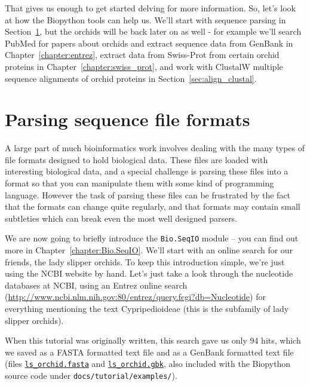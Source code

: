 \documentclass{report}
\begin{document}
That gives us enough to get started delving for more information. So, let's look at how the Biopython tools can help us.  We'll start with sequence parsing in Section~\ref{sec:sequence-parsing}, but the orchids will be back later on as well - for example we'll search PubMed for papers about orchids and extract sequence data from GenBank in Chapter~\ref{chapter:entrez}, extract data from Swiss-Prot from certain orchid proteins in Chapter~\ref{chapter:swiss_prot}, and work with ClustalW multiple sequence alignments of orchid proteins in Section~\ref{sec:align_clustal}.

\section{Parsing sequence file formats}
\label{sec:sequence-parsing}

A large part of much bioinformatics work involves dealing with the many types of file formats designed to hold biological data. These files are loaded with interesting biological data, and a special challenge is parsing these files into a format so that you can manipulate them with some kind of programming language. However the task of parsing these files can be frustrated by the fact that the formats can change quite regularly, and that formats may contain small subtleties which can break even the most well designed parsers.

We are now going to briefly introduce the \verb|Bio.SeqIO| module -- you can find out more in Chapter~\ref{chapter:Bio.SeqIO}.  We'll start with an online search for our friends, the lady slipper orchids. To keep this introduction simple, we're just using the NCBI website by hand.  Let's just take a look through the nucleotide databases at NCBI, using an Entrez online search (\url{http://www.ncbi.nlm.nih.gov:80/entrez/query.fcgi?db=Nucleotide}) for everything mentioning the text Cypripedioideae (this is the subfamily of lady slipper orchids).  

When this tutorial was originally written, this search gave us only 94 hits, which we saved as a FASTA formatted text file and as a GenBank formatted text file (files \href{http://biopython.org/DIST/docs/tutorial/examples/ls_orchid.fasta}{\tt ls\_orchid.fasta} and \href{http://biopython.org/DIST/docs/tutorial/examples/ls_orchid.gbk}{\tt ls\_orchid.gbk}, also included with the Biopython source code under {\tt docs/tutorial/examples/}).

\end{document}
